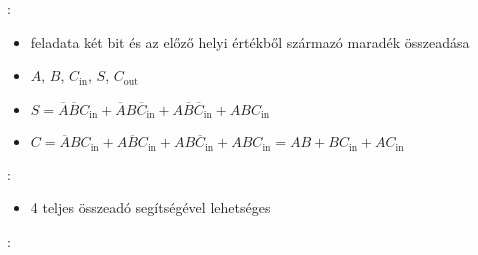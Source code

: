\documentclass[main.tex]{subfiles}
\begin{document}
  \vspace{2em}
  {\large {}:}
  \begin{itemize}
    \item feladata két bit és az előző helyi
    értékből származó maradék összeadása

    \item {} $A$, $B$, $C_{\mathrm{in}}$,
     $S$, $C_{\mathrm{out}}$

    \item $S
    = \overline{A}\overline{B}{C}_\mathrm{in}
    + \overline{A}{B}\overline{C}_\mathrm{in}
    + {A}\overline{B}\overline{C}_\mathrm{in}
    + {A}{B}{C_\mathrm{in}}$

    \item $C
    = \overline{A}{B}{C}_\mathrm{in}
    + {A}\overline{B}{C}_\mathrm{in}
    + {A}{B}\overline{C}_\mathrm{in}
    + {A}{B}{C_\mathrm{in}}
    = AB + BC_\mathrm{in} + AC_\mathrm{in}$
  \end{itemize}

  \vspace{2em}
  {\large {}:}
  \begin{itemize}
    \item 4 teljes összeadó segítségével lehetséges
  \end{itemize}

  \pagebreak
  {\large {}:}
\end{document}

